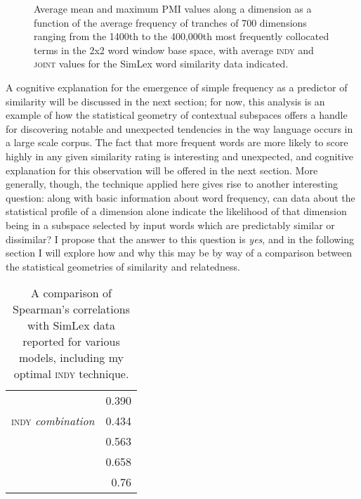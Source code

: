\begin{figure}
\caption{Average mean and maximum PMI values along a dimension as a function of the average frequency of tranches of 700 dimensions ranging from the 1400th to the 400,000th most frequently collocated terms in the 2x2 word window base space, with average \textsc{indy} and \textsc{joint} values for the SimLex word similarity data indicated.}
\label{fig:meanmax}
\end{figure}

A cognitive explanation for the emergence of simple frequency as a predictor of similarity will be discussed in the next section; for now, this analysis is an example of how the statistical geometry of contextual subspaces offers a handle for discovering notable and unexpected tendencies in the way language occurs in a large scale corpus.  The fact that more frequent words are more likely to score highly in any given similarity rating is interesting and unexpected, and cognitive explanation for this observation will be offered in the next section.  More generally, though, the technique applied here gives rise to another interesting question: along with basic information about word frequency, can data about the statistical profile of a dimension alone indicate the likelihood of that dimension being in a subspace selected by input words which are predictably similar or dissimilar?  I propose that the answer to this question is \emph{yes}, and in the following section I will explore how and why this may be by way of a comparison between the statistical geometries of similarity and relatedness.

\begin{table}
\centering
\begin{tabular}{lr}
\hline
\cite{MaEA2017} & 0.390 \\
\textsc{indy} \emph{combination} & 0.434 \\
\cite{SchwartzEA2015} & 0.563 \\
\cite{BanjadeEA2015} & 0.658 \\
\cite{RecskiEA2016} & 0.76 \\
\hline
\end{tabular}
\caption{A comparison of Spearman's correlations with SimLex data reported for various models, including my optimal \textsc{indy} technique.}
\label{tab:simpare}
\end{table}

